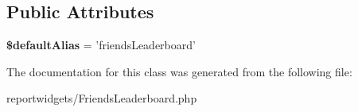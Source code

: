 \subsection*{Public Attributes}
\begin{DoxyCompactItemize}
\item 
\hypertarget{classDMA_1_1Friends_1_1ReportWidgets_1_1FriendsLeaderboard_ab1f836744d59c96df00f1fad2cddb01f}{{\bfseries \$default\-Alias} = 'friends\-Leaderboard'}\label{classDMA_1_1Friends_1_1ReportWidgets_1_1FriendsLeaderboard_ab1f836744d59c96df00f1fad2cddb01f}

\end{DoxyCompactItemize}


The documentation for this class was generated from the following file\-:\begin{DoxyCompactItemize}
\item 
reportwidgets/Friends\-Leaderboard.\-php\end{DoxyCompactItemize}
